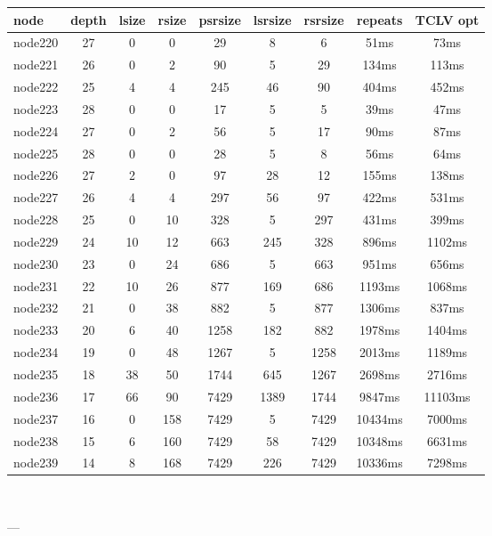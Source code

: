 \begin{tabular}{|l|c|c|c|c|c|c|c|c|}
\hline node & depth & lsize & rsize & psrsize & lsrsize & rsrsize   & repeats & TCLV opt\\
    \hline node220 & 27 & 0 & 0 & 29 & 8 & 6 & 51ms & 73ms\\
    \hline node221 & 26 & 0 & 2 & 90 & 5 & 29 & 134ms & 113ms\\
    \hline node222 & 25 & 4 & 4 & 245 & 46 & 90 & 404ms & 452ms\\
    \hline node223 & 28 & 0 & 0 & 17 & 5 & 5 & 39ms & 47ms\\
    \hline node224 & 27 & 0 & 2 & 56 & 5 & 17 & 90ms & 87ms\\
    \hline node225 & 28 & 0 & 0 & 28 & 5 & 8 & 56ms & 64ms\\
    \hline node226 & 27 & 2 & 0 & 97 & 28 & 12 & 155ms & 138ms\\
    \hline node227 & 26 & 4 & 4 & 297 & 56 & 97 & 422ms & 531ms\\
    \hline node228 & 25 & 0 & 10 & 328 & 5 & 297 & 431ms & 399ms\\
    \hline node229 & 24 & 10 & 12 & 663 & 245 & 328 & 896ms & 1102ms\\
    \hline node230 & 23 & 0 & 24 & 686 & 5 & 663 & 951ms & 656ms\\
    \hline node231 & 22 & 10 & 26 & 877 & 169 & 686 & 1193ms & 1068ms\\
    \hline node232 & 21 & 0 & 38 & 882 & 5 & 877 & 1306ms & 837ms\\
    \hline node233 & 20 & 6 & 40 & 1258 & 182 & 882 & 1978ms & 1404ms\\
    \hline node234 & 19 & 0 & 48 & 1267 & 5 & 1258 & 2013ms & 1189ms\\
    \hline node235 & 18 & 38 & 50 & 1744 & 645 & 1267 & 2698ms & 2716ms\\
    \hline node236 & 17 & 66 & 90 & 7429 & 1389 & 1744 & 9847ms & 11103ms\\
    \hline node237 & 16 & 0 & 158 & 7429 & 5 & 7429 & 10434ms & 7000ms\\
    \hline node238 & 15 & 6 & 160 & 7429 & 58 & 7429 & 10348ms & 6631ms\\
    \hline node239 & 14 & 8 & 168 & 7429 & 226 & 7429 & 10336ms & 7298ms\\

\hline
\end{tabular} \

---


